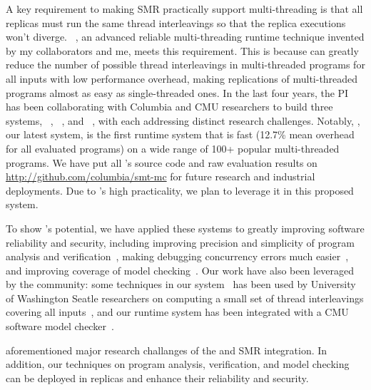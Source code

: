 A key requirement to making SMR practically support multi-threading is that all 
replicas must run the same thread interleavings so that the replica executions 
won't diverge. \smt~\cite{smt:cacm}, an advanced reliable multi-threading 
runtime technique invented by my collaborators and me, meets this requirement. 
This is because \smt can greatly reduce the number of possible thread 
interleavings in multi-threaded programs for all inputs with low performance 
overhead, making replications of multi-threaded programs almost as easy as 
single-threaded ones. In the last four years, the PI has been collaborating 
with Columbia and CMU researchers to build three \smt systems, 
\tern~\cite{cui:tern:osdi10}, \peregrine~\cite{peregrine:sosp11}, and 
\parrot~\cite{parrot:sosp13}, with each addressing distinct research 
challenges. Notably, \parrot, our latest system, is the first \smt runtime 
system that is fast (12.7\% mean overhead for all evaluated programs) on a wide 
range of 100+ popular multi-threaded programs. We have 
put all \parrot's source code and raw evaluation results on 
\url{http://github.com/columbia/smt-mc} for future research and industrial 
deployments. Due to \parrot's high practicality, we plan to leverage it in this 
proposed \msmr system.

To show \smt's potential, we have applied these systems to greatly improving 
software reliability and security, including improving precision and simplicity 
of program analysis and verification~\cite{wu:pldi12}, making debugging 
concurrency errors much easier~\cite{cui:tern:osdi10}, and improving coverage 
of model checking~\cite{parrot:sosp13}. Our work have also been leveraged by 
the community: some techniques in our \tern system~\cite{cui:tern:osdi10} has 
been used by University of Washington Seatle researchers on computing a small 
set of thread interleavings covering all inputs~\cite{ics:oopsla13}, and our 
\parrot runtime system has been integrated with a CMU software model 
checker~\cite{dbug:spin11}.

aforementioned major research challanges of the \smt and SMR integration. In 
addition, our techniques on program analysis, verification, and model checking 
can be deployed in \msmr replicas and enhance their reliability and security.


